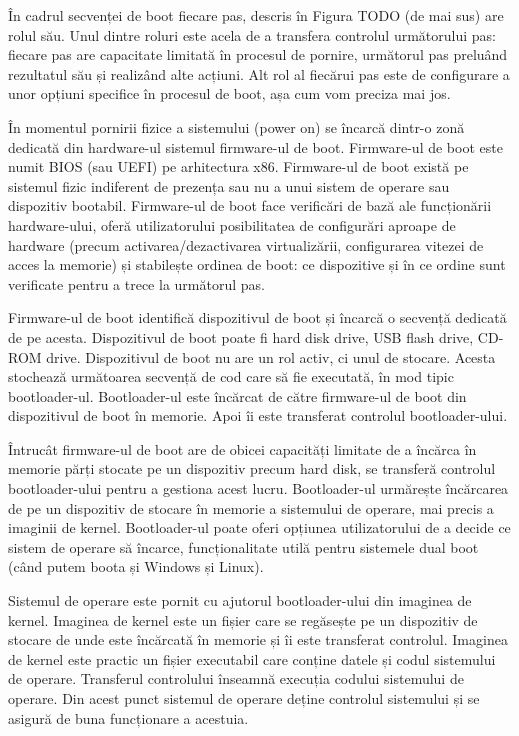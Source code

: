 În cadrul secvenței de boot fiecare pas, descris în Figura TODO (de mai sus) are
rolul său. Unul dintre roluri este acela de a transfera controlul următorului
pas: fiecare pas are capacitate limitată în procesul de pornire, următorul pas
preluând rezultatul său și realizând alte acțiuni.  Alt rol al fiecărui pas este
de configurare a unor opțiuni specifice în procesul de boot, așa cum vom preciza
mai jos.

În momentul pornirii fizice a sistemului (power on) se încarcă dintr-o zonă
dedicată din hardware-ul sistemul firmware-ul de boot. Firmware-ul de boot este
numit BIOS (sau UEFI) pe arhitectura x86.  Firmware-ul de boot există pe
sistemul fizic indiferent de prezența sau nu a unui sistem de operare sau
dispozitiv bootabil. Firmware-ul de boot face verificări de bază ale
funcționării hardware-ului, oferă utilizatorului posibilitatea de configurări
aproape de hardware (precum activarea/dezactivarea virtualizării, configurarea
vitezei de acces la memorie) și stabilește ordinea de boot: ce dispozitive și în
ce ordine sunt verificate pentru a trece la următorul pas.

Firmware-ul de boot identifică dispozitivul de boot și încarcă o secvență
dedicată de pe acesta.  Dispozitivul de boot poate fi hard disk drive, USB flash
drive, CD-ROM drive. Dispozitivul de boot nu are un rol activ, ci unul de
stocare. Acesta stochează următoarea secvență de cod care să fie executată, în
mod tipic bootloader-ul. Bootloader-ul este încărcat de către firmware-ul de
boot din dispozitivul de boot în memorie. Apoi îi este transferat controlul
bootloader-ului.

Întrucât firmware-ul de boot are de obicei capacități limitate de a încărca în
memorie părți stocate pe un dispozitiv precum hard disk, se transferă controlul
bootloader-ului pentru a gestiona acest lucru. Bootloader-ul urmărește
încărcarea de pe un dispozitiv de stocare în memorie a sistemului de operare,
mai precis a imaginii de kernel. Bootloader-ul poate oferi opțiunea
utilizatorului de a decide ce sistem de operare să încarce, funcționalitate
utilă pentru sistemele dual boot (când putem boota și Windows și Linux).

Sistemul de operare este pornit cu ajutorul bootloader-ului din imaginea de
kernel. Imaginea de kernel este un fișier care se regăsește pe un dispozitiv de
stocare de unde este încărcată în memorie și îi este transferat controlul.
Imaginea de kernel este practic un fișier executabil care conține datele și
codul sistemului de operare. Transferul controlului înseamnă execuția codului
sistemului de operare. Din acest punct sistemul de operare deține controlul
sistemului și se asigură de buna funcționare a acestuia.

